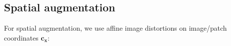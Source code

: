     \subsection{Spatial augmentation}
    For spatial augmentation, we use affine image distortions on image/patch coordinates $\mathbf{c_x}$:
